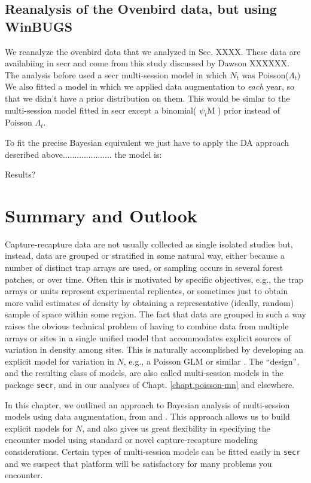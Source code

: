 \subsection{Reanalysis of the Ovenbird data, but using WinBUGS}

We reanalyze the ovenbird data that we analyzed in Sec. XXXX. These
data are availabiing in secr and come from this study discussed by
Dawson XXXXXX.
The analysis before used a secr multi-session model in which $N_{t}$
was Poisson($\Lambda_{t}$) We also fitted a model in which we applied
data augmentation to {\it each} year, so that we didn't have a prior
distribution on them.  This would be simlar to the multi-session model
fitted in secr except a binomial( $\psi_{t}$M ) prior instead of
Poisson $\Lambda_{t}$.

To fit the precise Bayesian equivalent we just have to apply the DA
approach described above..................... the model is:

Results?



\section{Summary and Outlook}

Capture-recapture data are not usually collected as single isolated
studies but, instead, data are grouped or stratified in some natural
way, either because a number of distinct trap arrays are used, or
sampling occurs in several forest patches, or over time. Often this is
motivated by specific objectives, e.g., the trap arrays or units
represent experimental replicates, or sometimes just to obtain more
valid estimates of density by obtaining a representative (ideally,
random) sample of space within some region.  The fact that data are
grouped in such a way raises the obvious technical problem of having
to combine data from multiple arrays or sites in a single unified
model that accommodates explicit sources of variation in density among
sites.  This is naturally accomplished by developing an explicit model
for variation in $N$, e.g., a Poisson GLM or similar
\citep{converse_royle:2012, royle_etal:2012arXiv}. The ``design'', and
the resulting class of models, are also called multi-session models in
the package \mbox{\tt secr}, and in our analyses of
Chapt. \ref{chapt.poisson-mn} and elsewhere.

In this chapter, we outlined an approach to Bayesian analysis of
multi-session models using data augmentation, from
\citet{converse_royle:2012} and \citet{royle_converse:2013}.  This
approach allows us to build explicit models for $N$, and also gives us
great flexibility in specifying the encounter model using standard or
novel capture-recapture modeling considerations. Certain types of
multi-session models can be fitted easily in \mbox{\tt secr} and we
suspect that platform will be satisfactory for many problems you
encounter.


